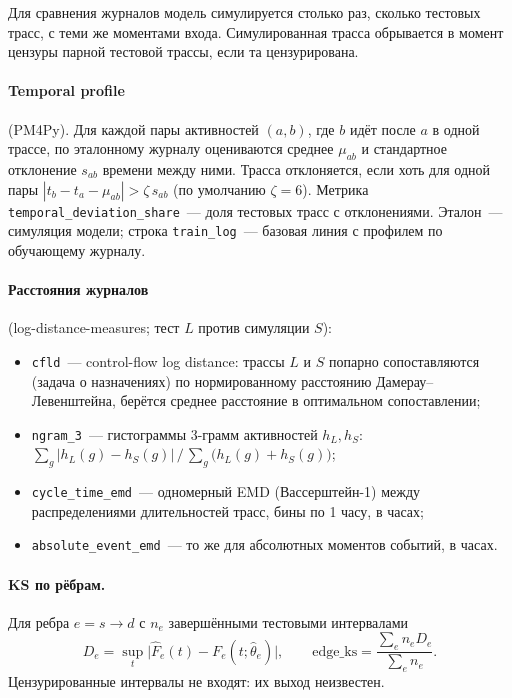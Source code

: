 \documentclass[11pt,a4paper]{article}
\newcommand{\code}[1]{\texttt{#1}}
\newcommand{\1}{\mathbf{1}}
\begin{document}
Для сравнения журналов модель симулируется столько раз, сколько тестовых трасс, с теми же
моментами входа. Симулированная трасса обрывается в момент цензуры парной
тестовой трассы, если та цензурирована.

\paragraph{Temporal profile} (PM4Py). Для каждой пары активностей $(a,b)$, где $b$ идёт
после $a$ в одной трассе, по эталонному журналу оцениваются среднее $\mu_{ab}$ и
стандартное отклонение $s_{ab}$ времени между ними. Трасса отклоняется, если хоть для
одной пары $|t_b-t_a-\mu_{ab}|>\zeta\,s_{ab}$ (по умолчанию $\zeta=6$). Метрика
\code{temporal\_deviation\_share}~--- доля тестовых трасс с отклонениями. Эталон~---
симуляция модели; строка \code{train\_log}~--- базовая линия с профилем по обучающему журналу.

\paragraph{Расстояния журналов} (log-distance-measures; тест $L$ против симуляции $S$):
\begin{itemize}
\item \code{cfld}~--- control-flow log distance: трассы $L$ и $S$ попарно сопоставляются
  (задача о назначениях) по нормированному расстоянию Дамерау--Левенштейна, берётся среднее
  расстояние в оптимальном сопоставлении;
\item \code{ngram\_3}~--- гистограммы 3-грамм активностей $h_L,h_S$:
  $\sum_g|h_L(g)-h_S(g)|\,/\,\sum_g\bigl(h_L(g)+h_S(g)\bigr)$;
\item \code{cycle\_time\_emd}~--- одномерный EMD (Вассерштейн-1) между распределениями
  длительностей трасс, бины по 1 часу, в часах;
\item \code{absolute\_event\_emd}~--- то же для абсолютных моментов событий, в часах.
\end{itemize}

\paragraph{KS по рёбрам.} Для ребра $e=s\to d$ с $n_e$ завершёнными тестовыми интервалами
\[
D_e=\sup_t\bigl|\hat F_e(t)-F_e(t;\hat\theta_e)\bigr|,\qquad
\mathrm{edge\_ks}=\frac{\sum_e n_e D_e}{\sum_e n_e}.
\]
Цензурированные интервалы не входят: их выход неизвестен.
\end{document}
